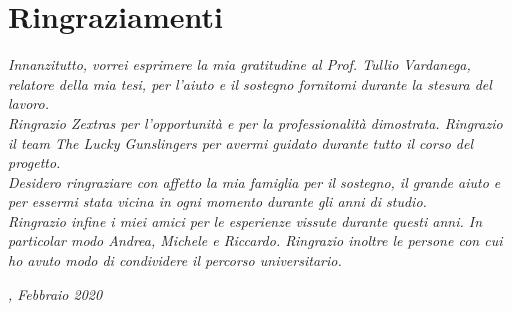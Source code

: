 
\cleardoublepage
{}
{}

\bigskip

\begingroup
\let\clearpage\relax
\let\cleardoublepage\relax
\let\cleardoublepage\relax

\chapter*{Ringraziamenti}

\noindent \textit{Innanzitutto, vorrei esprimere la mia gratitudine al Prof. Tullio Vardanega, relatore della mia tesi, per l'aiuto e il sostegno fornitomi durante la stesura del lavoro.}\\

\noindent \textit{Ringrazio Zextras per l'opportunità e per la professionalità dimostrata. Ringrazio il team The Lucky Gunslingers per avermi guidato durante tutto il corso del progetto.}\\

\noindent \textit{Desidero ringraziare con affetto la mia famiglia per il sostegno, il grande aiuto e per essermi stata vicina in ogni momento durante gli anni di studio.}\\

\noindent \textit{Ringrazio infine i miei amici per le esperienze vissute durante questi anni. In particolar modo Andrea, Michele e Riccardo. Ringrazio inoltre le persone con cui ho avuto modo di condividere il percorso universitario.}\\


\bigskip

\noindent\textit{\myLocation, Febbraio 2020}
\hfill \myName

\endgroup

